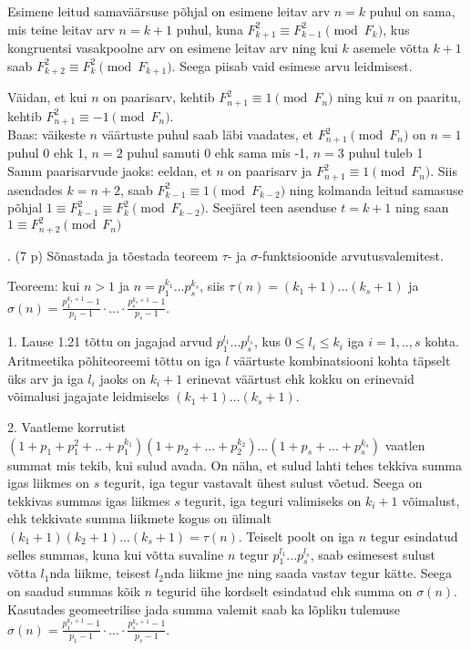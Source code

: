 \documentclass[a4paper, 10pt]{article}
\begin{document}
Esimene leitud samaväärsuse põhjal on esimene leitav arv $n=k$ puhul on sama, mis teine leitav arv $n=k+1$ puhul, kuna $F_{k+1}^2\equiv F_{k-1}^2\pmod{F_k}$, kus kongruentsi vasakpoolne arv on esimene leitav arv ning kui $k$ asemele võtta $k+1$ saab $F_{k+2}^2\equiv F_{k}^2\pmod{F_{k+1}}$. Seega piisab vaid esimese arvu leidmisest.

Väidan, et kui $n$ on paarisarv, kehtib $F_{n+1}^2\equiv1\pmod{F_n}$ ning kui $n$ on paaritu, kehtib $F_{n+1}^2\equiv-1\pmod{F_n}$.\\
Baas: väikeste $n$ väärtuste puhul saab läbi vaadates, et $F_{n+1}^2\pmod{F_n}$ on $n=1$ puhul 0 ehk 1, $n=2$ puhul samuti 0 ehk sama mis -1, $n=3$ puhul tuleb 1\\
Samm paarisarvude jaoks: eeldan, et $n$ on paarisarv ja $F_{n+1}^2\equiv1\pmod{F_n}$. Siis asendades $k=n+2$, saab $F_{k-1}^2\equiv1\pmod{F_{k-2}}$ ning kolmanda leitud samasuse põhjal $1\equiv F_{k-1}^2\equiv F_k^2\pmod{F_{k-2}}$. Seejärel teen asenduse $t=k+1$ ning saan $1\equiv F_{n+2}^2\pmod{F_{n}}$
\bigskip

. (7 p) Sõnastada ja tõestada teoreem $\tau$- ja $\sigma$-funktsioonide arvutusvalemitest.

\bigskip
Teoreem: kui $n>1$ ja $n=p_1^{k_1}...p_s^{k_s}$, siis $\tau(n)=(k_1+1)...(k_s+1)$ ja $\sigma(n)=\frac{p_1^{k_1+1}-1}{p_1-1}\cdot...\cdot\frac{p_s^{k_s+1}-1}{p_s-1}$.

1. Lause 1.21 tõttu on jagajad arvud $p_1^{l_1}...p_s^{l_s}$, kus $0\leq l_i\leq k_i$ iga $i=1,..,s$ kohta. Aritmeetika põhiteoreemi tõttu on iga $l$ väärtuste kombinatsiooni kohta täpselt üks arv ja iga $l_i$ jaoks on $k_i+1$ erinevat väärtust ehk kokku on erinevaid võimalusi jagajate leidmiseks $(k_1+1)...(k_s+1)$.

2. Vaatleme korrutist $(1+p_1+p_1^2+..+p_1^{k_1})(1+p_2+...+p_2^{k_2})...(1+p_s+...+p_s^{k_s})$ vaatlen summat mis tekib, kui sulud avada. On näha, et sulud lahti tehes tekkiva summa igas liikmes on $s$ tegurit, iga tegur vastavalt ühest sulust võetud. Seega on tekkivas summas igas liikmes $s$ tegurit, iga teguri valimiseks on $k_i+1$ võimalust, ehk tekkivate summa liikmete kogus on ülimalt $(k_1+1)(k_2+1)...(k_s+1)=\tau(n)$. Teiselt poolt on iga $n$ tegur esindatud selles summas, kuna kui võtta suvaline $n$ tegur $p_1^{l_1}...p_s^{l_s}$, saab esimesest sulust võtta $l_1$nda liikme, teisest $l_2$nda liikme jne ning saada vastav tegur kätte. Seega on saadud summas kõik $n$ tegurid ühe kordselt esindatud ehk summa on $\sigma(n)$. Kasutades geomeetrilise jada summa valemit saab ka lõpliku tulemuse $\sigma(n)=\frac{p_1^{k_1+1}-1}{p_1-1}\cdot...\cdot\frac{p_s^{k_s+1}-1}{p_s-1}$.\\

\end{document}
